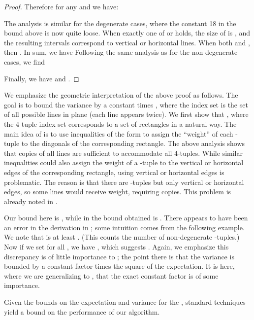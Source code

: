 \def\draft{0}  \documentclass[proceedings]{stacs}
\theoremstyle{plain}\newtheorem{satz}[thm]{Satz}
\theoremstyle{definition}\newtheorem{crucial}[thm]{Crucial Definition}
\begin{document}
\begin{proof}
Therefore for any 
and  we have:


The analysis is similar for the degenerate cases, where the constant 18 in the bound above is now quite loose.
When exactly one of
 or  holds, the size of
 is , and the resulting intervals correspond to vertical or horizontal
lines.  When both  and , then
. In sum, we have
Following the same analysis as for the non-degenerate cases, we find







Finally, we have  and
.
\end{proof}

We emphasize the geometric interpretation of the above proof as follows. The goal is to bound the variance by a constant times , where the index set is the set of all possible lines in plane  (each line appears twice). We first show that ,
where the 4-tuple index set corresponds to a set of rectangles in a natural way. The main idea of \cite{IM08} is to use inequalities of the form  to assign the ``weight'' of each -tuple to the diagonals of the corresponding rectangle.  The above analysis shows that  copies of all lines are sufficient to accommodate all 4-tuples. While similar inequalities could also assign the weight of a -tuple to the vertical or horizontal edges of the corresponding rectangle, using vertical or horizontal edges is problematic. The reason is that there are  -tuples but only  vertical or horizontal edges, so some lines would receive  weight, requiring  copies. This problem is already noted in \cite{BO01}.



Our bound here is , while in
\cite{IM08} the bound obtained is . There appears to have been an error in the derivation in \cite{IM08};
some intuition comes from the following example.
We note that  is at
least . (This counts the number of non-degenerate -tuples.) Now if we
set  for all , we have , which
suggests . Again, we emphasize this
discrepancy is of little importance to \cite{IM08};  the point there is that
the variance is bounded by a constant factor times the square of the expectation.
It is here, where we are generalizing to , that the exact
constant factor is of some importance.

Given the bounds on the expectation and variance for the ,
standard techniques yield a bound on the performance
of our algorithm.
\end{document}
